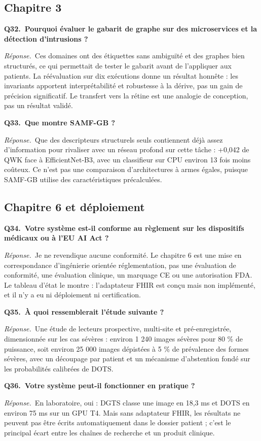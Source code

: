 \documentclass[11pt,a4paper]{article}
\begin{document}
\subsection*{Chapitre 3}
\textbf{Q32.~Pourquoi évaluer le gabarit de graphe sur des microservices et la détection d'intrusions ?}\par\nopagebreak
\textit{Réponse.}~Ces domaines ont des étiquettes sans ambiguïté et des graphes bien structurés, ce qui permettait de tester le gabarit avant de l'appliquer aux patients. La réévaluation sur dix exécutions donne un résultat honnête : les invariants apportent interprétabilité et robustesse à la dérive, pas un gain de précision significatif. Le transfert vers la rétine est une analogie de conception, pas un résultat validé.\par\medskip
\textbf{Q33.~Que montre SAMF-GB ?}\par\nopagebreak
\textit{Réponse.}~Que des descripteurs structurels seuls contiennent déjà assez d'information pour rivaliser avec un réseau profond sur cette tâche : +0,042 de QWK face à EfficientNet-B3, avec un classifieur sur CPU environ 13 fois moins coûteux. Ce n'est pas une comparaison d'architectures à armes égales, puisque SAMF-GB utilise des caractéristiques précalculées.\par\medskip
\subsection*{Chapitre 6 et déploiement}
\textbf{Q34.~Votre système est-il conforme au règlement sur les dispositifs médicaux ou à l'EU AI Act ?}\par\nopagebreak
\textit{Réponse.}~Je ne revendique aucune conformité. Le chapitre 6 est une mise en correspondance d'ingénierie orientée réglementation, pas une évaluation de conformité, une évaluation clinique, un marquage CE ou une autorisation FDA. Le tableau d'état le montre : l'adaptateur FHIR est conçu mais non implémenté, et il n'y a eu ni déploiement ni certification.\par\medskip
\textbf{Q35.~À quoi ressemblerait l'étude suivante ?}\par\nopagebreak
\textit{Réponse.}~Une étude de lecteurs prospective, multi-site et pré-enregistrée, dimensionnée sur les cas sévères : environ 1 240 images sévères pour 80 \% de puissance, soit environ 25 000 images dépistées à 5 \% de prévalence des formes sévères, avec un découpage par patient et un mécanisme d'abstention fondé sur les probabilités calibrées de DOTS.\par\medskip
\textbf{Q36.~Votre système peut-il fonctionner en pratique ?}\par\nopagebreak
\textit{Réponse.}~En laboratoire, oui : DGTS classe une image en 18,3 ms et DOTS en environ 75 ms sur un GPU T4. Mais sans adaptateur FHIR, les résultats ne peuvent pas être écrits automatiquement dans le dossier patient ; c'est le principal écart entre les chaînes de recherche et un produit clinique.\par\medskip
\end{document}
